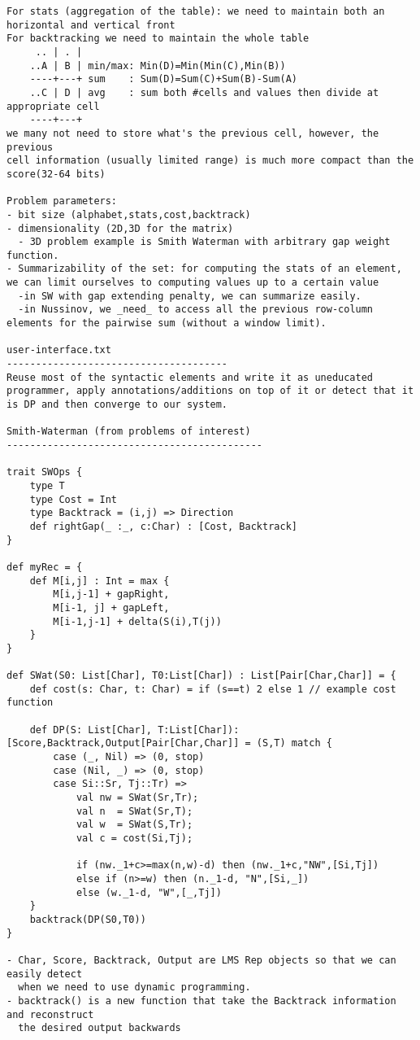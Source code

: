 \documentclass[11pt]{article}
\begin{document}
\begin{verbatim}
For stats (aggregation of the table): we need to maintain both an horizontal and vertical front
For backtracking we need to maintain the whole table
     .. | . |
	..A | B | min/max: Min(D)=Min(Min(C),Min(B))
	----+---+ sum    : Sum(D)=Sum(C)+Sum(B)-Sum(A)
	..C | D | avg    : sum both #cells and values then divide at appropriate cell
	----+---+
we many not need to store what's the previous cell, however, the previous
cell information (usually limited range) is much more compact than the score(32-64 bits)

Problem parameters:
- bit size (alphabet,stats,cost,backtrack)
- dimensionality (2D,3D for the matrix)
  - 3D problem example is Smith Waterman with arbitrary gap weight function.
- Summarizability of the set: for computing the stats of an element, we can limit ourselves to computing values up to a certain value
  -in SW with gap extending penalty, we can summarize easily.
  -in Nussinov, we _need_ to access all the previous row-column elements for the pairwise sum (without a window limit).

user-interface.txt
--------------------------------------
Reuse most of the syntactic elements and write it as uneducated programmer, apply annotations/additions on top of it or detect that it is DP and then converge to our system.

Smith-Waterman (from problems of interest)
--------------------------------------------

trait SWOps {
	type T
	type Cost = Int
	type Backtrack = (i,j) => Direction
	def rightGap(_ :_, c:Char) : [Cost, Backtrack]
}

def myRec = {
	def M[i,j] : Int = max {
		M[i,j-1] + gapRight,
		M[i-1, j] + gapLeft,
		M[i-1,j-1] + delta(S(i),T(j))
	}
}

def SWat(S0: List[Char], T0:List[Char]) : List[Pair[Char,Char]] = {
	def cost(s: Char, t: Char) = if (s==t) 2 else 1 // example cost function

	def DP(S: List[Char], T:List[Char]): [Score,Backtrack,Output[Pair[Char,Char]] = (S,T) match {
		case (_, Nil) => (0, stop)
		case (Nil, _) => (0, stop)
		case Si::Sr, Tj::Tr) =>
			val nw = SWat(Sr,Tr);
			val n  = SWat(Sr,T);
			val w  = SWat(S,Tr);
			val c = cost(Si,Tj);

			if (nw._1+c>=max(n,w)-d) then (nw._1+c,"NW",[Si,Tj])
			else if (n>=w) then (n._1-d, "N",[Si,_])
			else (w._1-d, "W",[_,Tj])
	}
	backtrack(DP(S0,T0))
}

- Char, Score, Backtrack, Output are LMS Rep objects so that we can easily detect
  when we need to use dynamic programming.
- backtrack() is a new function that take the Backtrack information and reconstruct
  the desired output backwards


\end{verbatim}
\end{document}
